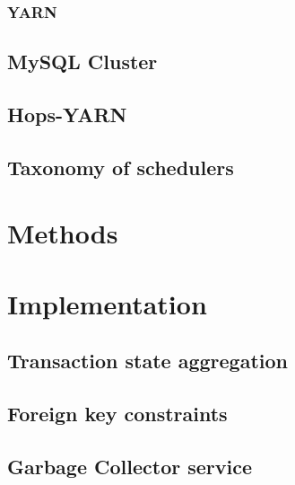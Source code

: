 \documentclass[12pt,a4paper,twoside,openright]{book}
\begin{document}
\subsection{YARN}
\label{ssec:yarn}


\section{MySQL Cluster}
\label{sec:ndb}


\section{Hops-YARN}
\label{sec:hopsyarn}


\section{Taxonomy of schedulers}
\label{sec:taxonomy_of_schedulers}


\chapter{Methods}
\label{chap:methods}


\chapter{Implementation}
\label{chap:implementation}


\section{Transaction state aggregation}
\label{sec:tx_aggregation}


\section{Foreign key constraints}
\label{sec:fk_constraints}


\section{Garbage Collector service}
\label{sec:gc_service}

\end{document}
